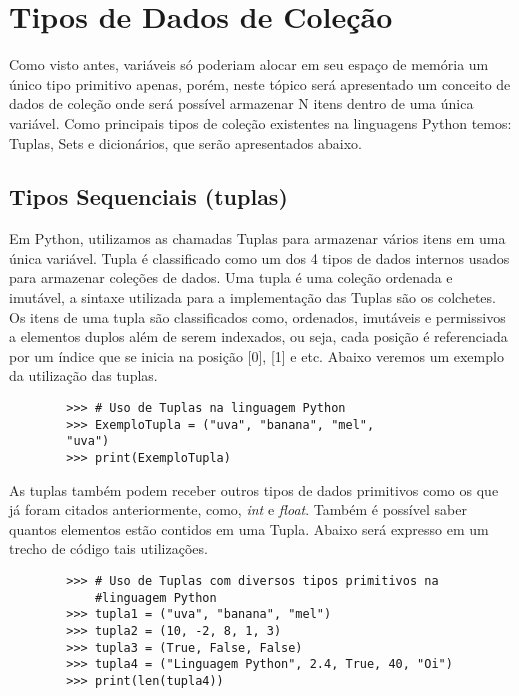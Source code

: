     \section{Tipos de Dados de Cole\c{c}\~{a}o}
Como visto antes, variáveis só poderiam alocar em seu espaço de memória um único tipo primitivo apenas, porém, neste tópico será apresentado um conceito de dados de coleção onde será possível armazenar N itens dentro de uma única variável. Como principais tipos de coleção existentes na linguagens Python temos: Tuplas, Sets e dicionários, que serão apresentados abaixo.

            \subsection{Tipos Sequenciais (tuplas)}
     Em Python, utilizamos as chamadas Tuplas para armazenar vários itens em uma única variável. Tupla é classificado como um dos 4 tipos de dados internos usados para armazenar coleções de dados. Uma tupla é uma coleção ordenada e imutável, a sintaxe utilizada para a implementação das Tuplas são os colchetes. \\
     
     Os itens de uma tupla são classificados como, ordenados, imutáveis e permissivos a elementos duplos além de serem indexados, ou seja, cada posição é referenciada por um índice que se inicia na posição [0], [1] e etc. Abaixo veremos um exemplo da utilização das tuplas.
     \begin{lstlisting}
     	>>> # Uso de Tuplas na linguagem Python
     	>>> ExemploTupla = ("uva", "banana", "mel", 
     	"uva")
     	>>> print(ExemploTupla)
     \end{lstlisting}
 
    As tuplas também podem receber outros tipos de dados primitivos como os que já foram citados anteriormente, como, \textit{int} e \textit{float}. Também é possível saber quantos elementos estão contidos em uma Tupla. Abaixo será expresso em um trecho de código tais utilizações.
     
    \begin{lstlisting}
    	>>> # Uso de Tuplas com diversos tipos primitivos na
            #linguagem Python
    	>>> tupla1 = ("uva", "banana", "mel")
    	>>> tupla2 = (10, -2, 8, 1, 3)
    	>>> tupla3 = (True, False, False)
    	>>> tupla4 = ("Linguagem Python", 2.4, True, 40, "Oi")
    	>>> print(len(tupla4))
    	
    \end{lstlisting} 
     
